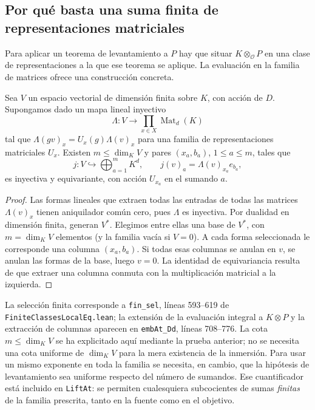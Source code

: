 \subsection{Por qué basta una suma finita de representaciones matriciales}
\label{subsec:pl-seleccion}

Para aplicar un teorema de levantamiento a $P$ hay que situar
$K\otimes_{\mathcal O}P$ en una clase de representaciones a la que
ese teorema se aplique. La evaluación en la familia de matrices
ofrece una construcción concreta.

\begin{lema}
\label{lem:pl-seleccion}
Sea $V$ un espacio vectorial de dimensión finita sobre $K$, con
acción de $D$. Supongamos dado un mapa lineal inyectivo
\[
 \Lambda:V\longrightarrow\prod_{x\in X}\operatorname{Mat}_d(K)
\]
tal que $\Lambda(gv)_x=U_x(g)\Lambda(v)_x$ para una familia de
representaciones matriciales $U_x$. Existen
$m\leq\dim_KV$ y pares $(x_a,b_a)$, $1\leq a\leq m$, tales que
\[
 j:V\hookrightarrow\bigoplus_{a=1}^m K^d,
 \qquad j(v)_a=\Lambda(v)_{x_a}e_{b_a},
\]
es inyectiva y equivariante, con acción $U_{x_a}$ en el sumando $a$.
\end{lema}
\begin{proof}
Las formas lineales que extraen todas las entradas de todas las
matrices $\Lambda(v)_x$ tienen aniquilador común cero, pues
$\Lambda$ es inyectiva. Por dualidad en dimensión finita, generan
$V^*$. Elegimos entre ellas una base de $V^*$, con $m=\dim_KV$
elementos (y la familia vacía si $V=0$). A cada forma seleccionada
le corresponde una columna $(x_a,b_a)$. Si todas esas columnas
se anulan en $v$, se anulan las formas de la base, luego $v=0$.
La identidad de equivariancia resulta de que extraer una columna
conmuta con la multiplicación matricial a la izquierda.
\end{proof}

La selección finita corresponde a \texttt{fin\_sel}, líneas
593--619 de \texttt{FiniteClassesLocalEq.lean}; la extensión de la
evaluación integral a $K\otimes P$ y la extracción de columnas
aparecen en \texttt{embAt\_Dd}, líneas 708--776. La cota
$m\leq\dim_KV$ se ha explicitado aquí mediante la prueba anterior;
no se necesita una cota uniforme de $\dim_KV$ para la mera
existencia de la inmersión. Para usar un mismo exponente en toda la
familia se necesita, en cambio, que la hipótesis de levantamiento
sea uniforme respecto del número de sumandos. Ese cuantificador
está incluido en \texttt{LiftAt}: se permiten cualesquiera
subcocientes de sumas \emph{finitas} de la familia prescrita, tanto
en la fuente como en el objetivo.

